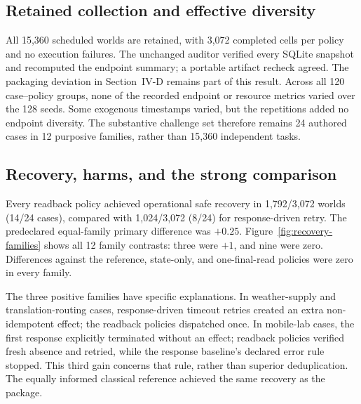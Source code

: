 \subsection{Retained collection and effective diversity}

All 15,360 scheduled worlds are retained, with 3,072 completed cells per policy and no execution failures. The unchanged auditor verified every SQLite snapshot and recomputed the endpoint summary; a portable artifact recheck agreed. The packaging deviation in Section~IV-D remains part of this result. Across all 120 case--policy groups, none of the recorded endpoint or resource metrics varied over the 128 seeds. Some exogenous timestamps varied, but the repetitions added no endpoint diversity. The substantive challenge set therefore remains 24 authored cases in 12 purposive families, rather than 15,360 independent tasks.

\subsection{Recovery, harms, and the strong comparison}

Every readback policy achieved operational safe recovery in 1,792/3,072 worlds (14/24 cases), compared with 1,024/3,072 (8/24) for response-driven retry. The predeclared equal-family primary difference was $+0.25$. Figure~\ref{fig:recovery-families} shows all 12 family contrasts: three were $+1$, and nine were zero. Differences against the reference, state-only, and one-final-read policies were zero in every family.

The three positive families have specific explanations. In weather-supply and translation-routing cases, response-driven timeout retries created an extra non-idempotent effect; the readback policies dispatched once. In mobile-lab cases, the first response explicitly terminated without an effect; readback policies verified fresh absence and retried, while the response baseline's declared error rule stopped. This third gain concerns that rule, rather than superior deduplication. The equally informed classical reference achieved the same recovery as the package.

